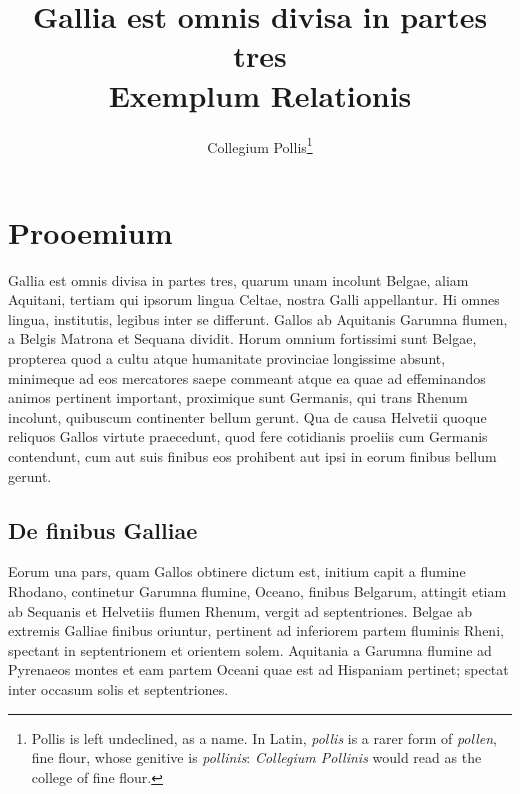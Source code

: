 \documentclass[11pt]{article}
\title{Gallia est omnis divisa in partes tres\\[0.4em]\large Exemplum Relationis}
\author{Collegium Pollis\thanks{Pollis is left undeclined, as a name. In Latin, \emph{pollis} is a rarer form of \emph{pollen}, fine flour, whose genitive is \emph{pollinis}: \emph{Collegium Pollinis} would read as the college of fine flour.}}
\date{}
\begin{document}

\maketitle


\section{Prooemium}

Gallia est omnis divisa in partes tres, quarum unam incolunt Belgae, aliam Aquitani, tertiam qui ipsorum lingua Celtae, nostra Galli appellantur. Hi omnes lingua, institutis, legibus inter se differunt. Gallos ab Aquitanis Garumna flumen, a Belgis Matrona et Sequana dividit. Horum omnium fortissimi sunt Belgae, propterea quod a cultu atque humanitate provinciae longissime absunt, minimeque ad eos mercatores saepe commeant atque ea quae ad effeminandos animos pertinent important, proximique sunt Germanis, qui trans Rhenum incolunt, quibuscum continenter bellum gerunt. Qua de causa Helvetii quoque reliquos Gallos virtute praecedunt, quod fere cotidianis proeliis cum Germanis contendunt, cum aut suis finibus eos prohibent aut ipsi in eorum finibus bellum gerunt.

\subsection{De finibus Galliae}

Eorum una pars, quam Gallos obtinere dictum est, initium capit a flumine Rhodano, continetur Garumna flumine, Oceano, finibus Belgarum, attingit etiam ab Sequanis et Helvetiis flumen Rhenum, vergit ad septentriones. Belgae ab extremis Galliae finibus oriuntur, pertinent ad inferiorem partem fluminis Rheni, spectant in septentrionem et orientem solem. Aquitania a Garumna flumine ad Pyrenaeos montes et eam partem Oceani quae est ad Hispaniam pertinet; spectat inter occasum solis et septentriones.
\end{document}
